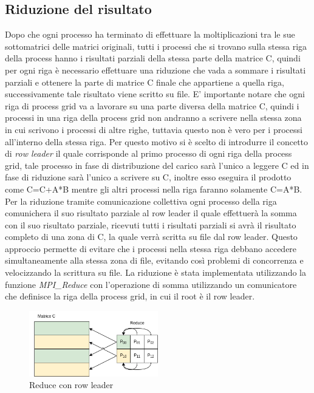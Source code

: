 \documentclass[conference]{IEEEtran}
\begin{document}
\subsection{Riduzione del risultato}
Dopo che ogni processo ha terminato di effettuare la moltiplicazioni tra le sue sottomatrici delle matrici originali, tutti i processi che si trovano sulla stessa riga della process hanno i risultati parziali della stessa parte della matrice C, quindi per ogni riga è necessario effettuare una riduzione che vada a sommare i risultati parziali e ottenere la parte di matrice C finale che appartiene a quella riga, successivamente tale risultato viene scritto su file. E' importante notare che ogni riga di process grid va a lavorare su una parte diversa della matrice C, quindi i processi in una riga della process grid non andranno a scrivere nella stessa zona in cui scrivono i processi di altre righe, tuttavia questo non è vero per i processi all'interno della stessa riga. Per questo motivo si è scelto di introdurre il concetto di \textit{row leader} il quale corrisponde al primo processo di ogni riga della process grid, tale processo in fase di distribuzione del carico sarà l'unico a leggere C ed in fase di riduzione sarà l'unico a scrivere su C, inoltre esso eseguira il prodotto come C=C+A*B mentre gli altri processi nella riga faranno solamente C=A*B. Per la riduzione tramite comunicazione collettiva ogni processo della riga comunichera il suo risultato parziale al row leader il quale effettuerà la somma con il suo risultato parziale, ricevuti tutti i risultati parziali si avrà il risultato completo di una zona di C, la quale verrà scritta su file dal row leader. Questo approccio permette di evitare che i processi nella stessa riga debbano accedere simultaneamente alla stessa zona di file, evitando così problemi di concorrenza e velocizzando la scrittura su file. La riduzione è stata implementata utilizzando la funzione \textit{MPI\_Reduce} con l'operazione di somma utilizzando un comunicatore che definisce la riga della process grid, in cui il root è il row leader.
\begin{figure}[H]
    \centering
    \includegraphics[width=0.5\textwidth]{resources/reduce.png}
    \caption{Reduce con row leader}
    \label{fig:row_leader_reduce}
\end{figure}
\end{document}
